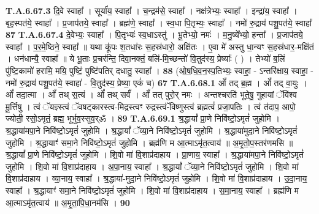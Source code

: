 \documentclass[17pt]{extarticle}
\begin{document}
                  \newline
                                                                  \textbf{ T.A.6.67.3} \newline
                  दि॒वे स्वाहा᳚ । सूर्या॑य॒ स्वाहा᳚ । च॒न्द्रम॑से॒ स्वाहा᳚ । नक्ष॑त्रेभ्यः॒ स्वाहा᳚ । इन्द्रा॑य॒ स्वाहा᳚ । बृह॒स्पत॑ये॒ स्वाहा᳚ । प्र॒जाप॑तये॒ स्वाहा᳚ ।  ब्रह्म॑णे॒ स्वाहा᳚ । स्व॒धा पि॒तृभ्यः॒ स्वाहा᳚ ।  नमो॑ रु॒द्राय॑ पशु॒पत॑ये॒ स्वाहा᳚ \textbf{ 87} \newline
                  \newline
                                                                  \textbf{ T.A.6.67.4} \newline
                  दे॒वेभ्यः॒ स्वाहा᳚ । पि॒तृभ्यः॑ स्व॒धाऽस्तु॑ । भू॒तेभ्यो॒ नमः॑ । म॒नु॒ष्ये᳚भ्यो॒ हन्ता᳚ । प्र॒जाप॑तये॒ स्वाहा᳚ । प॒र॒मे॒ष्ठिने॒ स्वाहा᳚ ॥  यथा कू॑पः श॒तधा॑रः स॒हस्र॑धारो॒ अक्षि॑तः ।  ए॒वा मे॑ अस्तु धा॒न्यꣳ स॒हस्र॑धार॒-मक्षि॑तं । धन॑धान्यै॒ स्वाहा᳚ ॥  ये भू॒ताः प्र॒चर॑न्ति॒ दिवा॒नक्तं॒ बलि॑-मि॒च्छन्तो॑ वि॒तुद॑स्य॒ प्रेष्याः᳚ ( ) । तेभ्यो॑ ब॒लिं पु॑ष्टि॒कामो॑ हरामि॒ मयि॒ पुष्टिं॒ पुष्टि॑पतिर् दधातु॒ स्वाहा᳚ । \textbf{ 88} \newline
                  \newline
                                                        (ओ॒ष॒धि॒व॒न॒स्प॒तिभ्यः॒ स्वाहा॒ - ऽन्तरि॑क्षाय॒ स्वाहा॒ - नमो॑ रु॒द्राय॑ पशु॒पत॑ये॒ स्वाहा॑ - वि॒तुद॑स्य॒ प्रेष्या॒ एकं॑ च) \textbf{67} \newline \newline
                                \textbf{ T.A.6.68.1} \newline
                  ओं᳚ तद् ब्र॒ह्म । ओं᳚ तद् वा॒युः । ओं᳚ तदा॒त्मा । ओं᳚ तथ् स॒त्यं । ओं᳚ तथ् सर्वं᳚ । ओं᳚ तत् पुरो॒र् नमः ।  अन्तश्चरति॑ भूते॒षु॒ गुहायां ॅवि॑श्व मू॒र्त्तिषु ।  त्वं ॅयज्ञ्स्त्वं ॅवषट्कारस्त्व-मिद्रस्त्वꣳ रुद्रस्त्वं-ॅविष्णुस्त्वं ब्रह्मत्वं॑ प्रजा॒पतिः ।  त्वं त॑दाप॒ आपो॒ ज्योती॒ रसो॒ऽमृतं॒ ब्रह्म॒ भूर्भुव॒स्सुव॒र्ॐ । \textbf{ 89} \newline
                  \newline
                                                         \textbf{} \newline \newline
                                \textbf{ T.A.6.69.1} \newline
                  श्र॒द्धायां᳚ प्रा॒णे निवि॑ष्टो॒ऽमृतं॑ जुहोमि ।  श्र॒द्धाया॑मपा॒ने निवि॑ष्टो॒ऽमृतं॑ जुहोमि ।  श्र॒द्धायां᳚ ॅव्या॒ने निवि॑ष्टो॒ऽमृतं॑ जुहोमि ।  श्र॒द्धाया॑मुदा॒ने निवि॑ष्टो॒ऽमृतं॑ जुहोमि ।  श्र॒द्धायाꣳ॑ समा॒ने निवि॑ष्टो॒ऽमृतं॑ जुहोमि ।  ब्रह्म॑णि म आ॒त्माऽमृ॑त॒त्वाय॑ ॥ अ॒मृ॒तो॒प॒स्तर॑णमसि ॥ श्र॒द्धायां᳚ प्रा॒णे निवि॑ष्टो॒ऽमृतं॑ जुहोमि ।  शि॒वो मा॑ वि॒शाप्र॑दाहाय । प्रा॒णाय॒ स्वाहा᳚ ।  श्र॒द्धाया॑मपा॒ने निवि॑ष्टो॒ऽमृतं॑ जुहोमि ।  शि॒वो मा॑ वि॒शाप्र॑दाहाय । अ॒पा॒नाय॒ स्वाहा᳚ ।  श्र॒द्धायां᳚ ॅव्या॒ने निवि॑ष्टो॒ऽमृतं॑ जुहोमि । शि॒वो मा॑ वि॒शाप्र॑दाहाय । व्या॒नाय॒ स्वाहा᳚ ।  श्र॒द्धाया॑-मुदा॒ने निवि॑ष्टो॒ऽमृतं॑ जुहोमि ।  शि॒वो मा॑ वि॒शाप्र॑दाहाय । उ॒दा॒नाय॒ स्वाहा᳚ ।  श्र॒द्धायाꣳ॑ समा॒ने निवि॑ष्टो॒ऽमृतं॑ जुहोमि । शि॒वो मा॑ वि॒शाप्र॑दाहाय । स॒मा॒नाय॒ स्वाहा᳚ ।  ब्रह्म॑णि म आ॒त्माऽमृ॑त॒त्वाय॑ ॥ अ॒मृ॒ता॒पि॒धा॒नम॑सि । \textbf{ 90} \newline
\end{document}
